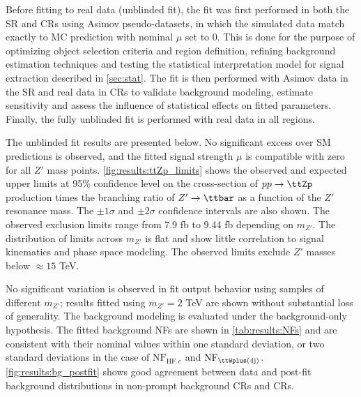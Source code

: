 \documentclass[../thesis.tex]{subfiles}
\begin{document}
Before fitting to real data (unblinded fit), the fit was first performed in both the \acs{SR} and \acs{CR}s using Asimov pseudo-datasets, in which the simulated data match exactly to \acs{MC} prediction with nominal $\mu$ set to 0. This is done for the purpose of optimizing object selection criteria and region definition, refining background estimation techniques and testing the statistical interpretation model for signal extraction described in \autoref{sec:stat}. The fit is then performed with Asimov data in the \acs{SR} and real data in \acs{CR}s to validate background modeling, estimate sensitivity and assess the influence of statistical effects on fitted parameters. Finally, the fully unblinded fit is performed with real data in all regions.

The unblinded fit results are presented below. No significant excess over \acs{SM} predictions is observed, and the fitted signal strength $\mu$ is compatible with zero for all $Z'$ mass points. \autoref{fig:results:ttZp_limits} shows the observed and expected upper limits at 95\% confidence level on the cross-section of $pp\rightarrow\ttZp$ production times the branching ratio of $Z'\rightarrow\ttbar$ as a function of the $Z'$ resonance mass. The $\pm 1\sigma$ and $\pm 2\sigma$ confidence intervals are also shown. The observed exclusion limits range from 7.9 fb to 9.44 fb depending on $m_{Z'}$.
The distribution of limits across $m_{Z'}$ is flat and show little correlation to signal kinematics and phase space modeling.
The observed limits exclude $Z'$ masses below $\approx 15$ TeV.

No significant variation is observed in fit output behavior using \ttZp samples of different $m_{Z'}$; results fitted using $m_{Z'}=2$ TeV are shown without substantial loss of generality. The background modeling is evaluated under the background-only hypothesis. The fitted background \acs{NF}s are shown in \autoref{tab:results:NFs} and are consistent with their nominal values within one standard deviation, or two standard deviations in the case of $\mathrm{NF}_{\text{HF }e}$ and $\mathrm{NF}_{\ttWplus(4\mathrm{j})}$. \autoref{fig:results:bg_postfit} shows good agreement between data and post-fit background distributions in non-prompt background \acs{CR}s and \ttW \acs{CR}s.
\end{document}
